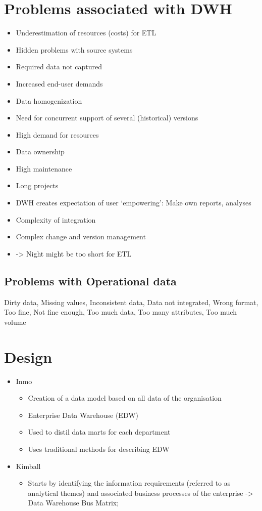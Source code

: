 \documentclass{report}
\begin{document}
    \section{Problems associated with DWH}
    \begin{itemize}
        \item Underestimation of resources (costs) for ETL
        \item Hidden problems with source systems
        \item Required data not captured
        \item Increased end-user demands
        \item Data homogenization
        \item Need for concurrent support of several (historical) versions
        \item High demand for resources
        \item Data ownership
        \item High maintenance
        \item Long projects
        \item DWH creates expectation of user ‘empowering’: Make own reports, analyses
        \item Complexity of integration
        \item Complex change and version management
        \item -> Night might be too short for ETL
    \end{itemize}
    \subsection{Problems with Operational data}
    Dirty data, Missing values, Inconsistent data, Data not integrated, Wrong format, Too fine, Not fine enough, Too much data, Too many attributes, Too much volume
    
    \section{Design}
    \begin{itemize}
        \item Inmo
        \begin{itemize}
            \item Creation of a data model based on all data of the organisation
            \item Enterprise Data Warehouse (EDW)
            \item Used to distil data marts for each department
            \item Uses traditional methods for describing EDW
        \end{itemize}
        \item Kimball
        \begin{itemize}
            \item Starts by identifying the information requirements (referred to as analytical themes) and associated business processes of the enterprise -> Data Warehouse Bus Matrix; 
        \end{itemize}
    \end{itemize}
\end{document}
